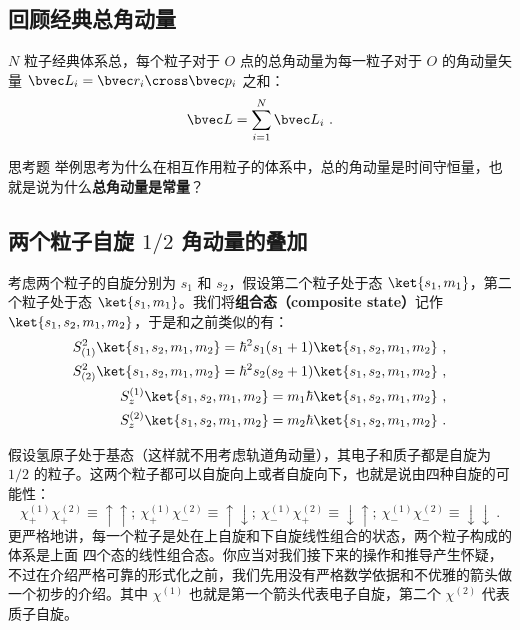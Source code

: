 \subsection{回顾经典总角动量}
$N$ 粒子经典体系总，每个粒子对于 $O$ 点的总角动量为每一粒子对于 $O$ 的角动量矢量 $\bvec L_i=\bvec r_i\cross\bvec p_i$ 之和：
\begin{equation}
\bvec L = \sum_{i=1}^N \bvec L_i~.
\end{equation}
\begin{exercise}{思考题}
举例思考为什么在相互作用粒子的体系中，总的角动量是时间守恒量，也就是说为什么\textbf{总角动量是常量}？
\end{exercise}
\subsection{两个粒子自旋 $1/2$ 角动量的叠加}
考虑两个粒子的自旋分别为 $s_1$ 和 $s_2$，假设第二个粒子处于态 $\ket{s_1,m_1}$，第二个粒子处于态 $\ket{s_1,m_1}$。我们将\textbf{组合态（composite state）}记作 $\ket{s_1,s_2,m_1,m_2}$，于是和之前类似的有：
\begin{align}
S_{(1)}^2\ket{s_1,s_2,m_1,m_2} = \hbar^2 s_1(s_1+1)\ket{s_1,s_2,m_1,m_2}~,\\
S_{(2)}^2\ket{s_1,s_2,m_1,m_2} = \hbar^2 s_2(s_2+1)\ket{s_1,s_2,m_1,m_2}~,\\
S^{(1)}_z\ket{s_1,s_2,m_1,m_2} = m_1\hbar\ket{s_1,s_2,m_1,m_2}~,\\
S^{(2)}_z\ket{s_1,s_2,m_1,m_2} = m_2\hbar\ket{s_1,s_2,m_1,m_2}~.
\end{align}

假设氢原子处于基态（这样就不用考虑轨道角动量），其电子和质子都是自旋为 $1/2$ 的粒子。这两个粒子都可以自旋向上或者自旋向下，也就是说由四种自旋的可能性：
\begin{equation}
\chi^{(1)}_+\chi^{(2)}_+\equiv\uparrow\uparrow;\ \chi^{(1)}_+\chi^{(2)}_-\equiv\uparrow\downarrow;\ \chi^{(1)}_-\chi^{(2)}_+\equiv\downarrow\uparrow;\ \chi^{(1)}_-\chi^{(2)}_-\equiv\downarrow\downarrow~.
\end{equation}
更严格地讲，每一个粒子是处在上自旋和下自旋线性组合的状态，两个粒子构成的体系是上面
四个态的线性组合态。你应当对我们接下来的操作和推导产生怀疑，不过在介绍严格可靠的形式化之前，我们先用没有严格数学依据和不优雅的箭头做一个初步的介绍。其中 $\chi^{(1)}$ 也就是第一个箭头代表电子自旋，第二个 $\chi^{(2)}$ 代表质子自旋。

